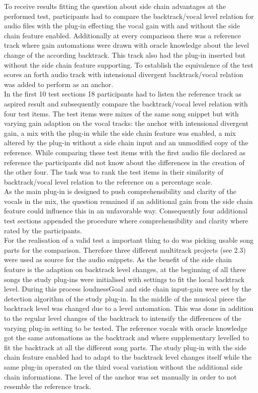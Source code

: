 To receive results fitting the question about side chain advantages at the performed test, participants had to compare the backtrack/vocal level relation for audio files with the plug-in effecting the vocal gain with and without the side chain feature enabled. Additionally at every comparison there was a reference track where gain automations were drawn with oracle knowledge about the level change of the according backtrack. This track also had the plug-in inserted but without the side chain feature supporting. To establish the equivalence of the test scores an forth audio track with intensional divergent backtrack/vocal relation was added to perform as an anchor.\\
In the first 10 test sections 18 participants had to listen the reference track as aspired result and subsequently compare the backtrack/vocal level relation with four test items. The test items were mixes of the same song snippet but with varying gain adaption on the vocal tracks: the anchor with intensional divergent gain, a mix with the plug-in while the side chain feature was enabled, a mix altered by the plug-in without a side chain input and an unmodified copy of the reference. While comparing these test items with the first audio file declared as reference the participants did not know about the differences in the creation of the other four. The task was to rank the test items in their similarity of backtrack/vocal level relation to the reference on a percentage scale.\\
As the main plug-in is designed to push comprehensibility and clarity of the vocals in the mix, the question remained if an additional gain from the side chain feature could influence this in an unfavorable way. Consequently four additional test sections appended the procedure where comprehensibility and clarity where rated by the participants.\\
For the realisation of a valid test a important thing to do was picking usable song parts for the comparison. Therefore three different multitrack projects (see 2.3) were used as source for the audio snippets. As the benefit of the side chain feature is the adaption on backtrack level changes, at the beginning of all three songs the study plug-ins were initialised with settings to fit the local backtrack level. During this process loudnessGoal and side chain input-gain were set by the detection algorithm of the study plug-in. In the middle of the musical piece the backtrack level was changed due to a level automation. This was done in addition to the regular level changes of the backtrack to intensify the differences of the varying plug-in setting to be tested. The reference vocals with oracle knowledge got the same automations as the backtrack and where supplementary levelled to fit the backtrack at all the different song parts. The study plug-in with the side chain feature enabled had to adapt to the backtrack level changes itself while the same plug-in operated on the third vocal variation without the additional side chain informations. The level of the anchor was set manually in order to not resemble the reference track.\\
